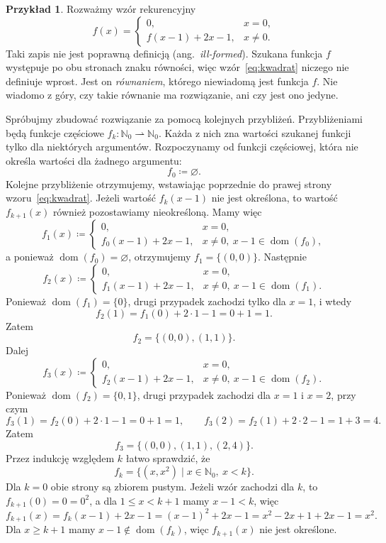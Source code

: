 \documentclass[11pt,a4paper]{article}
\theoremstyle{definition}
\newtheorem{przyklad}[definicja]{Przykład}
\theoremstyle{plain}
\newcommand{\dom}{\operatorname{dom}}
\begin{document}
\begin{przyklad}
	Rozważmy wzór rekurencyjny
	\begin{equation}\label{eq:kwadrat}
		f(x)=
		\begin{cases}
			0, & x=0,\\
			f(x-1)+2x-1, & x\neq0.
		\end{cases}
	\end{equation}
	Taki zapis nie jest poprawną definicją (ang.\ \emph{ill-formed}).
	Szukana funkcja $f$ występuje po obu stronach znaku równości, więc
	wzór~\eqref{eq:kwadrat} niczego nie definiuje wprost. Jest on
	\emph{równaniem}, którego niewiadomą jest funkcja $f$. Nie wiadomo
	z góry, czy takie równanie ma rozwiązanie, ani czy jest ono jedyne.
	
	Spróbujmy zbudować rozwiązanie za pomocą kolejnych przybliżeń.
	Przybliżeniami będą funkcje częściowe
	$f_k:\mathbb{N}_0\rightharpoonup\mathbb{N}_0$. Każda z nich zna wartości
	szukanej funkcji tylko dla niektórych argumentów. Rozpoczynamy od funkcji
	częściowej, która nie określa wartości dla żadnego argumentu:
	\[
	f_0\coloneqq \varnothing.
	\]
	Kolejne przybliżenie otrzymujemy, wstawiając poprzednie do prawej strony
	wzoru~\eqref{eq:kwadrat}. Jeżeli wartość $f_k(x-1)$ nie jest określona,
	to wartość $f_{k+1}(x)$ również pozostawiamy nieokreśloną. Mamy więc
	\[
	f_1(x)\coloneqq
	\begin{cases}
		0, & x=0,\\
		f_0(x-1)+2x-1, & x\neq0,\ x-1\in\dom(f_0),
	\end{cases}
	\]
	a ponieważ $\dom(f_0)=\varnothing$, otrzymujemy $f_1=\{(0,0)\}$.
	Następnie
	\[
	f_2(x)\coloneqq
	\begin{cases}
		0, & x=0,\\
		f_1(x-1)+2x-1, & x\neq0,\ x-1\in\dom(f_1).
	\end{cases}
	\]
	Ponieważ $\dom(f_1)=\{0\}$, drugi przypadek zachodzi tylko dla $x=1$,
	i wtedy
	\[
	f_2(1)=f_1(0)+2\cdot1-1=0+1=1.
	\]
	Zatem
	\[
	f_2=\{(0,0),(1,1)\}.
	\]
	Dalej
	\[
	f_3(x)\coloneqq
	\begin{cases}
		0, & x=0,\\
		f_2(x-1)+2x-1, & x\neq0,\ x-1\in\dom(f_2).
	\end{cases}
	\]
	Ponieważ $\dom(f_2)=\{0,1\}$, drugi przypadek zachodzi dla $x=1$ i $x=2$,
	przy czym
	\[
	f_3(1)=f_2(0)+2\cdot1-1=0+1=1,
	\qquad
	f_3(2)=f_2(1)+2\cdot2-1=1+3=4.
	\]
	Zatem
	\[
	f_3=\{(0,0),(1,1),(2,4)\}.
	\]
	Przez indukcję względem $k$ łatwo sprawdzić, że
	\[
	f_k=\{(x,x^2)\mid x\in\mathbb N_0,\ x<k\}.
	\]
	Dla $k=0$ obie strony są zbiorem pustym. Jeżeli wzór zachodzi dla $k$,
	to $f_{k+1}(0)=0=0^2$, a dla $1\leq x<k+1$ mamy $x-1<k$, więc
	\[
	f_{k+1}(x)=f_k(x-1)+2x-1=(x-1)^2+2x-1=x^2-2x+1+2x-1=x^2.
	\]
	Dla $x\geq k+1$ mamy $x-1\notin\dom(f_k)$, więc $f_{k+1}(x)$ nie jest
	określone.
	

\end{przyklad}
\end{document}
